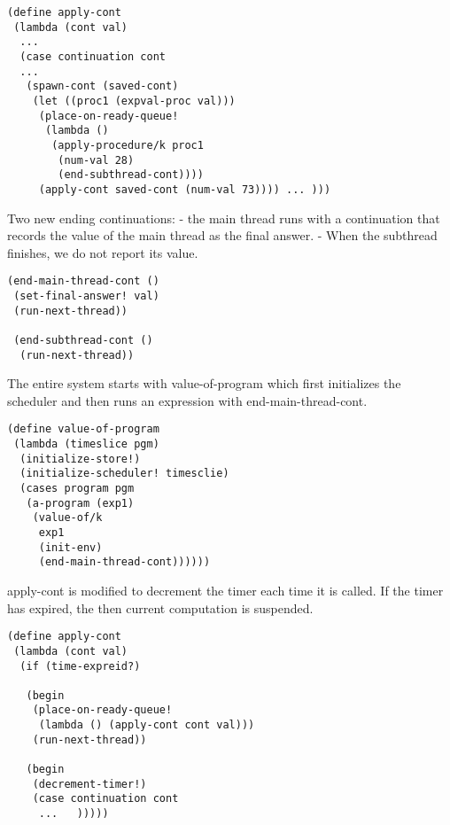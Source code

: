 \documentclass{article}
\begin{document}
\begin{huge}
\begin{lstlisting}
(define apply-cont
 (lambda (cont val)
  ...
  (case continuation cont
  ...
   (spawn-cont (saved-cont) 
    (let ((proc1 (expval-proc val)))
     (place-on-ready-queue!
      (lambda ()
       (apply-procedure/k proc1
        (num-val 28)
        (end-subthread-cont))))
     (apply-cont saved-cont (num-val 73)))) ... )))
\end{lstlisting}


Two new ending continuations: \al
- the main thread runs with a continuation that records the value of the main thread as the final answer. \al
- When the subthread finishes, we do not report its value. \al

\begin{lstlisting}
(end-main-thread-cont ()
 (set-final-answer! val)
 (run-next-thread))
 
 (end-subthread-cont ()
  (run-next-thread))
\end{lstlisting}

The entire system starts with value-of-program which first initializes the scheduler and then runs an expression with end-main-thread-cont.

\begin{lstlisting}
(define value-of-program
 (lambda (timeslice pgm)
  (initialize-store!)
  (initialize-scheduler! timesclie)
  (cases program pgm
   (a-program (exp1)
    (value-of/k 
     exp1
     (init-env)
     (end-main-thread-cont))))))
\end{lstlisting}


apply-cont is modified to decrement the timer each time it is called. 
If the timer has expired, the then current computation is suspended.

\begin{lstlisting}
(define apply-cont
 (lambda (cont val)
  (if (time-expreid?)
  
   (begin
    (place-on-ready-queue!
     (lambda () (apply-cont cont val)))
    (run-next-thread))
    
   (begin
    (decrement-timer!)
    (case continuation cont
     ...   )))))
\end{lstlisting}


\end{huge}
\end{document}
